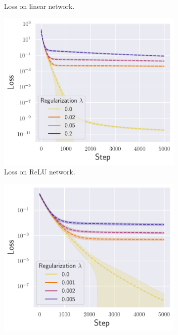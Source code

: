 \begin{figure}[h]
\begin{subfigure}[b]{.33\textwidth}
  \caption{Loss on linear network.}
  \label{fig:loss_lr_non_autograd_l2}
\end{subfigure}\hfill
\begin{subfigure}[b]{.33\textwidth}
  \centering
  \includegraphics[width=\linewidth]{figures/loss_nn_relu_autograd_l2_v1.pdf}
  \caption{Loss on ReLU network.}
  \label{fig:loss_nn_relu_autograd_l2}
\end{subfigure}\hfill
\begin{subfigure}[b]{.33\textwidth}
  \centering
  \includegraphics[width=\linewidth]{figures/loss_nn_tanh_autograd_l2_v1.pdf}

\end{subfigure}
\end{figure}

